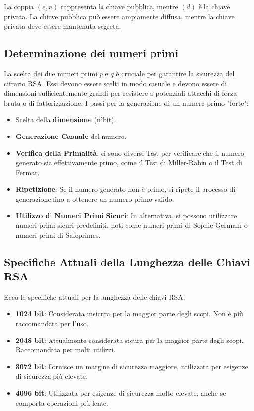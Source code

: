 \documentclass[a4paper,12pt]{report}
\begin{document}
La coppia $(e, n)$ rappresenta la chiave pubblica, mentre $(d)$ è la chiave privata. La chiave pubblica può essere ampiamente diffusa, mentre la chiave privata deve essere mantenuta segreta.

\subsection*{Determinazione dei numeri primi}
La scelta dei due numeri primi $p$ e $q$ è cruciale per garantire la sicurezza del cifrario RSA. 
Essi devono essere scelti in modo casuale e devono essere di dimensioni sufficientemente grandi per resistere a potenziali attacchi di forza bruta o di fattorizzazione.
I passi per la generazione di un numero primo "forte":

\begin{itemize}
    \item{Scelta della \textbf{dimensione} (n°bit).}
    \item{\textbf{Generazione Casuale} del numero.} 
    \item{\textbf{Verifica della Primalità}: ci sono diversi Test per verificare che il numero generato sia effettivamente primo, come il Test di Miller-Rabin o il Test di Fermat. \cite{stein2008}}
    \item{\textbf{Ripetizione}: Se il numero generato non è primo, si ripete il processo di generazione fino a ottenere un numero primo valido.}
    \item{\textbf{Utilizzo di Numeri Primi Sicuri}: In alternativa, si possono utilizzare numeri primi sicuri predefiniti, noti come numeri primi di Sophie Germain o numeri primi di Safeprimes. \cite{boneh2005}}
\end{itemize}

\subsection*{Specifiche Attuali della Lunghezza delle Chiavi RSA}

Ecco le specifiche attuali per la lunghezza delle chiavi RSA:

\begin{itemize}
    \item \textbf{1024 bit}: Considerata insicura per la maggior parte degli scopi. Non è più raccomandata per l'uso.
    \item \textbf{2048 bit}: Attualmente considerata sicura per la maggior parte degli scopi. Raccomandata per molti utilizzi.
    \item \textbf{3072 bit}: Fornisce un margine di sicurezza maggiore, utilizzata per esigenze di sicurezza più elevate.
    \item \textbf{4096 bit}: Utilizzata per esigenze di sicurezza molto elevate, anche se comporta operazioni più lente.
\end{itemize}
\end{document}
